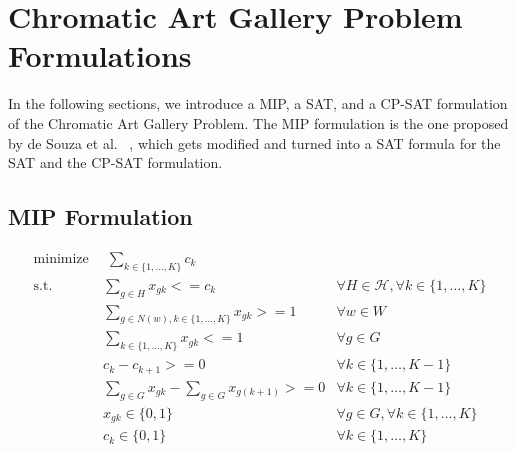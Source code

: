 \chapter{Chromatic Art Gallery Problem Formulations}

In the following sections, we introduce a MIP, a SAT, and a CP-SAT formulation of the Chromatic Art Gallery Problem. The MIP formulation is the one proposed by de Souza et al. ~\cite{zambon2014exact}, which gets modified and turned into a SAT formula for the SAT and the CP-SAT formulation.

\section{MIP Formulation}

\begin{align}
\label{eq_MIP:f.0} \mbox{minimize}~& \;\sum_{k\in \{1,\ldots,K\}} c_{k}& \\
\label{eq_MIP:f.1} \mbox{s.t. } &\sum_{g \in H}x_{gk} <= c_{k} & \forall H \in \mathcal{H}, \forall k\in \{1,\ldots,K\}\\
\label{eq_MIP:f.2}&\sum_{g\in N(w), k\in \{1,\ldots,K\}}x_{gk}>=1 & \forall w\in W\\
\label{eq_MIP:f.3}&\sum_{k\in \{1,\ldots,K\}}x_{gk}<=1 & \forall g\in G\\
\label{eq_MIP:f.4}&c_{k} - c_{k+1} >= 0 & \forall k\in \{1,\ldots,K-1\}\\
\label{eq_MIP:f.5}&\sum_{g\in G}x_{gk} - \sum_{g\in G}x_{g(k+1)} >= 0 & \forall k\in \{1,\ldots,K-1\}\\
\label{eq_MIP:f.6}& x_{gk} \in \{0,1\} & \forall g\in G, \forall k\in \{1,\ldots,K\}\\
\label{eq_MIP:f.7}& c_{k}\in \{0,1\} & \forall k\in \{1,\ldots,K\}
\end{align}

